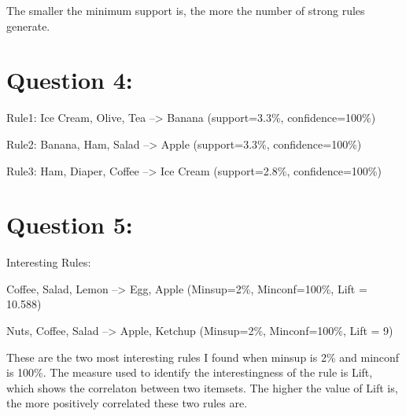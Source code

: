 \documentclass[titlepage]{article}
\begin{document}
The smaller the minimum support is, the more the number of strong rules generate.

\section{Question 4:}
\label{sec:org526304c}
Rule1: Ice Cream, Olive, Tea --> Banana (support=3.3\%, confidence=100\%)

Rule2: Banana, Ham, Salad --> Apple (support=3.3\%, confidence=100\%)

Rule3: Ham, Diaper, Coffee --> Ice Cream (support=2.8\%, confidence=100\%)

\section{Question 5:}
\label{sec:org3fc3054}
Interesting Rules: 

Coffee, Salad, Lemon --> Egg, Apple (Minsup=2\%, Minconf=100\%, Lift = 10.588)

Nuts, Coffee, Salad --> Apple, Ketchup (Minsup=2\%, Minconf=100\%, Lift = 9)

These are the two most interesting rules I found when minsup is 2\% and minconf
is 100\%. The measure used to identify the interestingness of the rule is Lift,
which shows the correlaton between two itemsets. The higher the value of Lift
is, the more positively correlated these two rules are.
\end{document}
